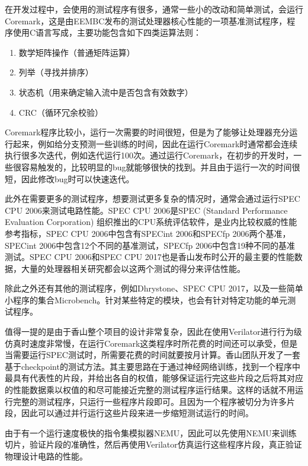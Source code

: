 在开发过程中，会使用的测试程序有很多，通常一些小的改动和简单测试，会运行Coremark，这是由EEMBC发布的测试处理器核心性能的一项基准测试程序，程序使用C语言写成，主要功能包含如下四类运算法则：

\begin{enumerate}
	\item 数学矩阵操作（普通矩阵运算）
	\item 列举（寻找并排序）
	\item 状态机（用来确定输入流中是否包含有效数字）
	\item CRC（循环冗余校验）
\end{enumerate}

Coremark程序比较小，运行一次需要的时间很短，但是为了能够让处理器充分运行起来，例如给分支预测一些训练的时间，因此在运行Coremark时通常都会连续执行很多次迭代，例如迭代运行100次。通过运行Coremark，在初步的开发时，一些很容易触发的，比较明显的bug就能够很快的找到。并且由于运行一次的时间很短，因此修改bug时可以快速迭代。

此外在需要更多的测试程序，想要测试更多复杂的情况时，通常会通过运行SPEC CPU 2006\cite{spec-2006}来测试电路性能。SPEC CPU 2006是SPEC (Standard Performance Evaluation Corporation) 组织推出的CPU系统评估软件，是业内比较权威的性能参考指标，SPEC CPU 2006中包含有SPECint 2006和SPECfp 2006两个基准，SPECint 2006中包含12个不同的基准测试，SPECfp 2006中包含19种不同的基准测试。SPEC CPU 2006和SPEC CPU 2017也是香山发布时公开的最主要的性能数据，大量的处理器相关研究都会以这两个测试的得分来评估性能。

除此之外还有其他的测试程序，例如Dhrystone\cite{dhrystone}、SPEC CPU 2017，以及一些简单小程序的集合Microbench。针对某些特定的模块，也会有针对特定功能的单元测试程序。


值得一提的是由于香山整个项目的设计非常复杂，因此在使用Verilator进行行为级仿真时速度非常慢，在运行Coremark这类程序时所花费的时间还可以承受，但是当需要运行SPEC测试时，所需要花费的时间就要按月计算。香山团队开发了一套基于checkpoint的测试方法。其主要思路在于通过神经网络训练，找到一个程序中最具有代表性的片段，并给出各自的权值，能够保证运行完这些片段之后将其对应的性能数据乘以权值的和尽可能接近完整的测试程序运行结果。这样的话就不用运行完整的测试程序，只运行一些程序片段即可。且因为一个程序被切分为许多片段，因此可以通过并行运行这些片段来进一步缩短测试运行的时间。

由于有一个运行速度极快的指令集模拟器NEMU，因此可以先使用NEMU来训练切片，验证片段的准确性，然后再使用Verilator仿真运行这些程序片段，真正验证物理设计电路的性能。

